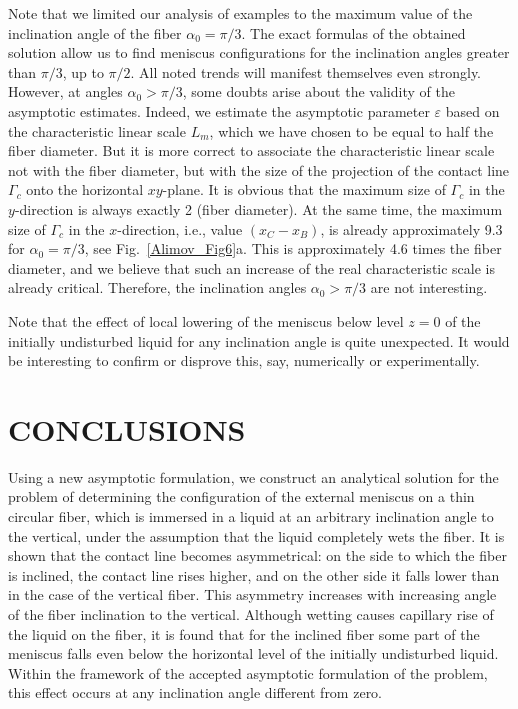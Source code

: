 \documentclass[
11pt,%
tightenlines,%
twoside,%
onecolumn,%
nofloats,%
nobibnotes,%
nofootinbib,%
superscriptaddress,%
noshowpacs,%
centertags]%
{revtex4-2}
\begin{document}
Note that we limited our analysis of examples to the maximum value of the inclination angle of the
fiber $\alpha _0 = \pi/3$. The exact formulas of the obtained solution allow us to find meniscus
configurations for the inclination angles greater than $\pi/3$, up to $\pi/2$. All noted trends
will manifest themselves even strongly. However, at angles $\alpha_0 > \pi/3$, some doubts arise
about the validity of the asymptotic estimates. Indeed, we estimate the asymptotic parameter
$\varepsilon$ based on the characteristic linear scale $L_m$, which we have chosen to be equal to
half the fiber diameter. But it is more correct to associate the characteristic linear scale not
with the fiber diameter, but with the size of the projection of the contact line $\Gamma_c$ onto
the horizontal $xy$-plane. It is obvious that the maximum size of $\Gamma_c $ in the $y$-direction
is always exactly 2 (fiber diameter). At the same time, the maximum size of $\Gamma_c $ in the
$x$-direction, i.e., value $(x_C - x_B)$, is already approximately 9.3 for $\alpha_0 = \pi/3$, see
Fig.~\ref{Alimov_Fig6}a. This is approximately 4.6 times the fiber diameter, and we believe that
such an increase of the real characteristic scale is already critical. Therefore, the inclination
angles $\alpha_0 > \pi/3$ are not interesting.

Note that the effect of local lowering of the meniscus below level $z = 0$ of the initially
undisturbed liquid for any inclination angle is quite unexpected. It would be interesting to
confirm or disprove this, say, numerically or experimentally.

\section*{CONCLUSIONS}
Using a new asymptotic formulation, we construct an analytical solution for the problem of
determining the configuration of the external meniscus on a thin circular fiber, which is immersed
in a liquid at an arbitrary inclination angle to the vertical, under the assumption that the liquid
completely wets the fiber. It is shown that the contact line becomes asymmetrical: on the side to
which the fiber is inclined, the contact line rises higher, and on the other side it falls lower
than in the case of the vertical fiber. This asymmetry increases with increasing angle of the fiber
inclination to the vertical. Although wetting causes capillary rise of the liquid on the fiber, it
is found that for the inclined fiber some part of the meniscus falls even below the horizontal
level of the initially undisturbed liquid. Within the framework of the accepted asymptotic
formulation of the problem, this effect occurs at any inclination angle different from zero.
\end{document}
